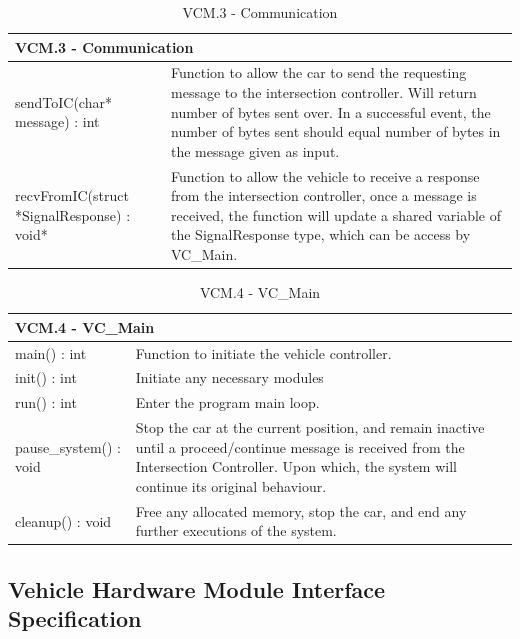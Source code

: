 \documentclass [10pt]{article}
\begin{document}
\begin{longtable}{| p{ } | p{ } | }\caption{VCM.3 - Communication} \\\hline  
 \multicolumn{2}{|l|}{\textbf {VCM.3 - Communication}}\\ \hline
\rowcolor{tableCell}sendToIC(char* message) : int & Function to allow the car to send the requesting message to the intersection controller. Will return number of bytes sent over. In a successful event, the number of bytes sent should equal number of bytes in the message given as input. \\ \hline 

recvFromIC(struct *SignalResponse) : void*  &Function to allow the vehicle to receive a response from the intersection controller, once a message is received, the function will update a shared variable of the SignalResponse type, which can be access by VC\_Main. \\ \hline 

\end{longtable}


\begin{longtable}{| p{ } | p{ } | }\caption{VCM.4 - VC\_Main} \\\hline  
 \multicolumn{2}{|l|}{\textbf {VCM.4 - VC\_Main}}\\ \hline
\cellcolor{tableCell}main() : int & \cellcolor{tableCell}Function to initiate the vehicle controller.  \\ \hline 

init() : int & Initiate any necessary modules \\ \hline

\cellcolor{tableCell}run() : int & \cellcolor{tableCell}Enter the program main loop.  \\ \hline 
pause\_system() : void & Stop the car at the current position, and remain inactive until a proceed/continue message is received from the Intersection Controller. Upon which, the system will continue its original behaviour. \\ \hline
\cellcolor{tableCell}cleanup() : void & \cellcolor{tableCell} Free any allocated memory, stop the car, and end any further executions of the system.  \\ \hline 
\end{longtable}

\subsection{Vehicle Hardware Module Interface Specification}
\newcommand{\VCMPWMsig}{set\_PWM(pin\_number, duty\_cycle) : void}
\newcommand{\VCMPWMdesc}{Used to output a PWM signal to a given GPIO pin at a given duty cycle.}
\end{document}
